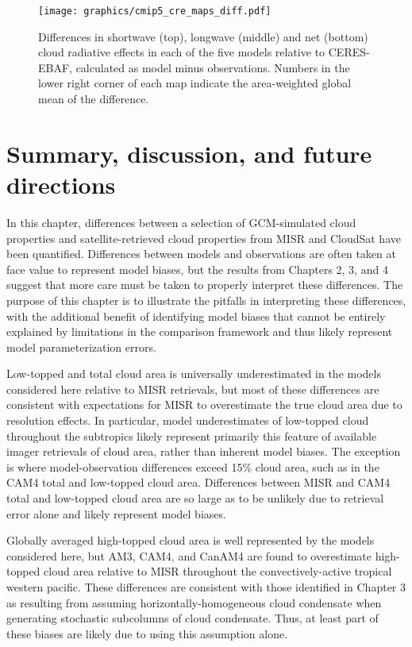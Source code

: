 \begin{figure}[htbp]
\centering
\texttt{[image: graphics/cmip5\_cre\_maps\_diff.pdf]}
\caption{\label{fig:cmip5_cre_maps_diff}Differences in shortwave (top),
longwave (middle) and net (bottom) cloud radiative effects in each of
the five models relative to CERES-EBAF, calculated as model minus
observations. Numbers in the lower right corner of each map indicate the
area-weighted global mean of the
difference.}\label{fig:cmip5ux5fcreux5fmapsux5fdiff}
\end{figure}

\section{Summary, discussion, and future
directions}\label{summary-discussion-and-future-directions}

In this chapter, differences between a selection of GCM-simulated cloud
properties and satellite-retrieved cloud properties from MISR and
CloudSat have been quantified. Differences between models and
observations are often taken at face value to represent model biases,
but the results from Chapters 2, 3, and 4 suggest that more care must be
taken to properly interpret these differences. The purpose of this
chapter is to illustrate the pitfalls in interpreting these differences,
with the additional benefit of identifying model biases that cannot be
entirely explained by limitations in the comparison framework and thus
likely represent model parameterization errors.

Low-topped and total cloud area is universally underestimated in the
models considered here relative to MISR retrievals, but most of these
differences are consistent with expectations for MISR to overestimate
the true cloud area due to resolution effects. In particular, model
underestimates of low-topped cloud throughout the subtropics likely
represent primarily this feature of available imager retrievals of cloud
area, rather than inherent model biases. The exception is where
model-observation differences exceed 15\% cloud area, such as in the
CAM4 total and low-topped cloud area. Differences between MISR and CAM4
total and low-topped cloud area are so large as to be unlikely due to
retrieval error alone and likely represent model biases.

Globally averaged high-topped cloud area is well represented by the
models considered here, but AM3, CAM4, and CanAM4 are found to
overestimate high-topped cloud area relative to MISR throughout the
convectively-active tropical western pacific. These differences are
consistent with those identified in Chapter 3 as resulting from assuming
horizontally-homogeneous cloud condensate when generating stochastic
subcolumns of cloud condensate. Thus, at least part of these biases are
likely due to using this assumption alone.

